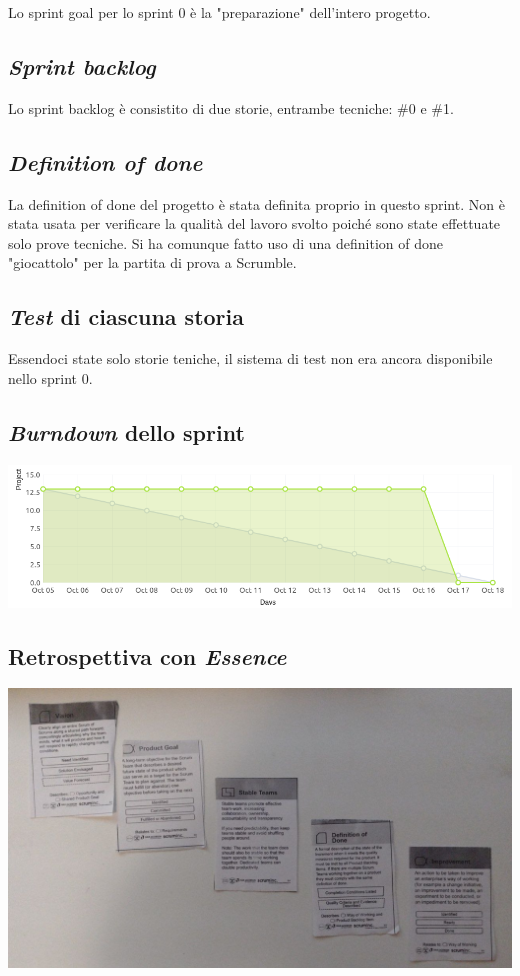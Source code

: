 \documentclass{article}
\begin{document}
Lo sprint goal per lo sprint 0 è la "preparazione" dell'intero progetto.

\subsection{\emph{Sprint backlog}}

Lo sprint backlog è consistito di due storie, entrambe tecniche: \#0 e \#1.

\subsection{\emph{Definition of done}}

La definition of done del progetto è stata definita proprio in questo sprint.
Non è stata usata per verificare la qualità del lavoro svolto poiché sono state
effettuate solo prove tecniche. Si ha comunque fatto uso di una definition of
done "giocattolo" per la partita di prova a Scrumble.

\subsection{\emph{Test} di ciascuna storia}

Essendoci state solo storie teniche, il sistema di test non era ancora
disponibile nello sprint 0.

\subsection{\emph{Burndown} dello sprint}

\includegraphics[width=\textwidth]{burndown-0}

\subsection{Retrospettiva con \emph{Essence}}

\includegraphics[width=\textwidth]{essence-0}
\end{document}
